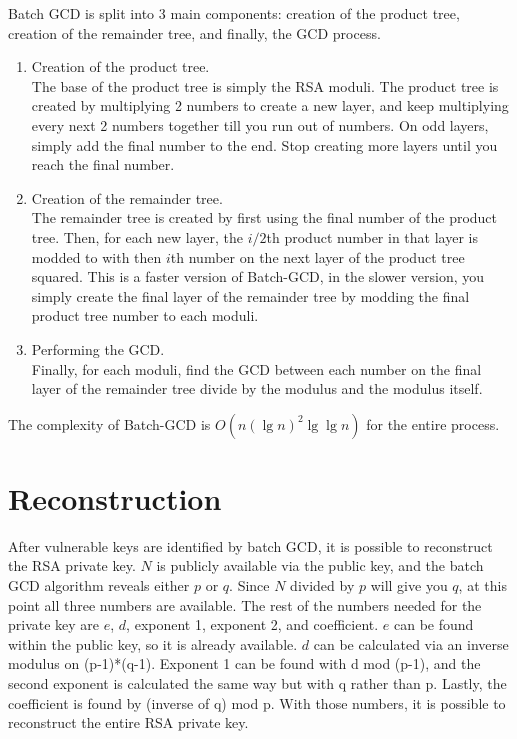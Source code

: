 \documentclass[10pt, letterpaper]{article}
\begin{document}
Batch GCD is split into 3 main components: creation of the product tree, creation of the remainder tree, and finally, the GCD process.

\begin{enumerate}
\item Creation of the product tree. \\
  The base of the product tree is simply the RSA moduli. The product tree is created by multiplying 2 numbers to create a new layer, and keep multiplying every next 2 numbers together till you run out of numbers. On odd layers, simply add the final number to the end. Stop creating more layers until you reach the final number.
\item Creation of the remainder tree. \\
  The remainder tree is created by first using the final number of the product tree. Then, for each new layer, the $i/2$th product number in that layer is modded to with then $i$th number on the next layer of the product tree squared. This is a faster version of Batch-GCD, in the slower version, you simply create the final layer of the remainder tree by modding the final product tree number to each moduli.
\item Performing the GCD. \\
  Finally, for each moduli, find the GCD between each number on the final layer of the remainder tree divide by the modulus and the modulus itself.
\end{enumerate}

The complexity of Batch-GCD is $O(n(\lg{n})^2 \lg{\lg{n}})$ for the entire process.

\section{Reconstruction}
After vulnerable keys are identified by batch GCD, it is possible to reconstruct the RSA private key. $N$ is publicly available via the public key, and the batch GCD algorithm reveals either $p$ or $q$.  Since $N$ divided by $p$ will give you $q$, at this point all three numbers are available. The rest of the numbers needed for the private key are $e$, $d$, exponent 1, exponent 2, and coefficient.  $e$ can be found within the public key, so it is already available. $d$ can be calculated via an inverse modulus on (p-1)*(q-1). Exponent 1 can be found with d mod (p-1), and the second exponent is calculated the same way but with q rather than p. Lastly, the coefficient is found by (inverse of q) mod p. With those numbers, it is possible to reconstruct the entire RSA private key.
\end{document}

